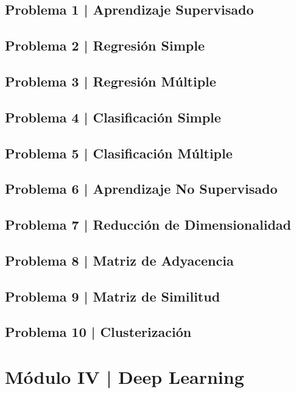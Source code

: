 \documentclass{article}
\begin{document}
\subsection*{Problema 1 | Aprendizaje Supervisado}

\subsection*{Problema 2 | Regresión Simple}

\subsection*{Problema 3 | Regresión Múltiple}

\subsection*{Problema 4 | Clasificación Simple}

\subsection*{Problema 5 | Clasificación Múltiple}

\subsection*{Problema 6 | Aprendizaje No Supervisado}

\subsection*{Problema 7 | Reducción de Dimensionalidad}

\subsection*{Problema 8 | Matriz de Adyacencia}

\subsection*{Problema 9 | Matriz de Similitud}

\subsection*{Problema 10 | Clusterización}

\clearpage

\section*{Módulo IV | Deep Learning}
\end{document}
